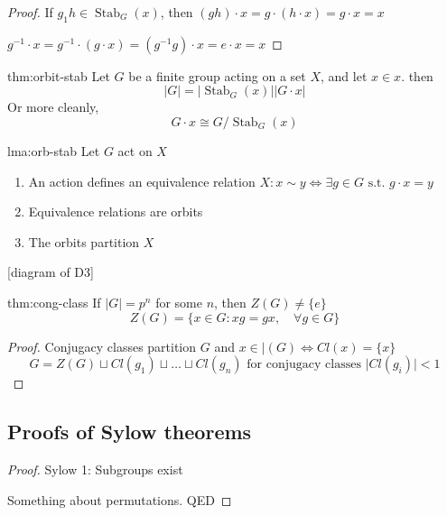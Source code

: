 \documentclass{article}
\DeclareMathOperator{\Stab}{Stab}
\begin{document}
\begin{proof}
    If $g_{1}h\in \Stab_{G}(x)$, then $(gh) \cdot x = g \cdot (h \cdot x) = g \cdot x = x$

    $g^{-1} \cdot x = g^{-1} \cdot (g \cdot x) = (g^{-1}g) \cdot x = e \cdot x = x$
\end{proof}

\begin{thm}{thm:orbit-stab}{}
    Let $G$ be a finite group acting on a set $X$, and let $x\in x$. then
    \[\lvert G \rvert = \lvert \Stab_{G}(x) \rvert \lvert G \cdot x \rvert\]
    Or more cleanly,
    \[G \cdot x \cong G / \Stab_{G}(x)\]
\end{thm}

\newpage
\begin{lma}[]{lma:orb-stab}{}
    Let $G$ act on $X$
    \begin{enumerate}
        \item An action defines an equivalence relation $X : x \sim y \iff \exists g\in G \text{ s.t. } g \cdot x = y$
        \item Equivalence relations are orbits
        \item The orbits partition $X$
    \end{enumerate}
\end{lma}

[diagram of D3]


\newpage

\begin{thm}{thm:cong-class}{}
    If $\lvert G \rvert = p^{n}$ for some $n$, then $Z(G) \ne \{e\}$
    \[Z(G) = \{x \in G : xg = gx, \quad \forall g\in G\}\]
\end{thm}

\begin{proof}
    Conjugacy classes partition $G$ and $x\in |(G) \iff Cl(x) = \{x\}$
    \[G = Z(G) \sqcup Cl(g_{1}) \sqcup \dots \sqcup Cl(g_{n}) \text{ for conjugacy classes } \lvert Cl(g_{i}) \rvert < 1\]
\end{proof}

\subsection{Proofs of Sylow theorems}

\begin{proof}
    Sylow 1: Subgroups exist

    Something about permutations. QED
\end{proof}
\end{document}
